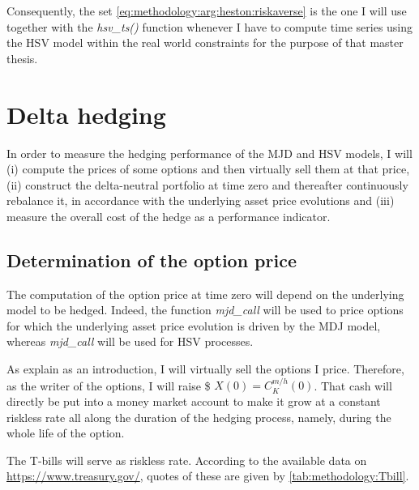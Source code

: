 \documentclass[12pt]{report}
\begin{document}
Consequently, the set \ref{eq:methodology:arg:heston:riskaverse} is the one I will use together with the \textit{hsv\_ts()} function whenever I have to compute time series using the HSV model within the real world constraints for the purpose of that master thesis.



\section{Delta hedging}
\label{sec:methodology:delta}

In order to measure the hedging performance of the MJD and HSV models, I will (i) compute the prices of some options and then virtually sell them at that price, (ii)  construct the delta-neutral portfolio at time zero and thereafter continuously rebalance it, in accordance with the underlying asset price evolutions and (iii) measure the overall cost of the hedge as a performance indicator.




\subsection{Determination of the option price}
\label{sec:methodology:determination}

The computation of the option price at time zero will depend on the underlying model to be hedged.
Indeed, the function \textit{mjd\_call} will be used to price options for which the underlying asset price evolution is driven by the MDJ model, whereas \textit{mjd\_call} will be used for HSV processes.

As explain as an introduction, I will virtually sell the options I price.
Therefore, as the writer of the options, I will raise \$ $X(0) = C_K^{m/h} (0)$.
That cash will directly be put into a money market account to make it grow at a constant riskless rate all along the duration of the hedging process, namely, during the whole life of the option.

The T-bills will serve as riskless rate. According to the available data on \url{https://www.treasury.gov/}, quotes of these are given by \cref{tab:methodology:Tbill}.
\end{document}
